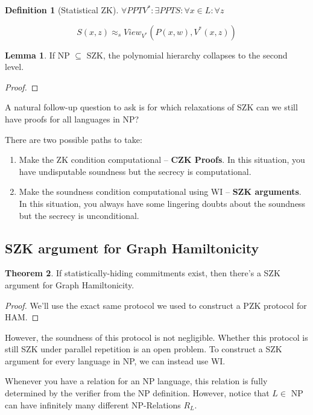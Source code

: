 \documentclass{article}
\theoremstyle{definition}
\newtheorem{definition}{Definition}
\newtheorem{theorem}{Theorem}[section]
\newtheorem{lemma}[theorem]{Lemma}
\begin{document}
\begin{definition}[Statistical ZK]
    $\forall PPT V^{*}: \exists PPT S: \forall x \in L: \forall z$

    \[ S(x,z) \approx_{s} View_{V^{*}}(P(x,w),V^{*}(x,z)) \]
\end{definition}

\begin{lemma}
    If NP $\subseteq$ SZK, the polynomial hierarchy collapses to the second level.
\end{lemma}
\begin{proof}
    
\end{proof}

A natural follow-up question to ask is for which relaxations of SZK can we still have
proofs for all languages in NP?

There are two possible paths to take:

\begin{enumerate}
    \item Make the ZK condition computational -- \textbf{CZK Proofs}. In this situation, you have
    undisputable soundness but the secrecy is computational.
    \item Make the soundness condition computational using WI -- \textbf{SZK arguments}. In this situation,
    you always have some lingering doubts about the soundness but the secrecy is unconditional.
\end{enumerate}

\subsection{SZK argument for Graph Hamiltonicity}

\begin{theorem}
    If statistically-hiding commitments exist, then there's a SZK argument for Graph
    Hamiltonicity.
\end{theorem}
\begin{proof}
    We'll use the exact same protocol we used to construct a PZK protocol
    for HAM.
\end{proof}

However, the soundness of this protocol is not negligible. Whether this protocol is still
SZK under parallel repetition is an open problem. To construct a SZK argument for every language
in NP, we can instead use WI.

Whenever you have a relation for an NP language, this relation is fully determined
by the verifier from the NP definition. However, notice that $L \in$ NP can have infinitely
many different NP-Relations $R_{L}$.
\end{document}
